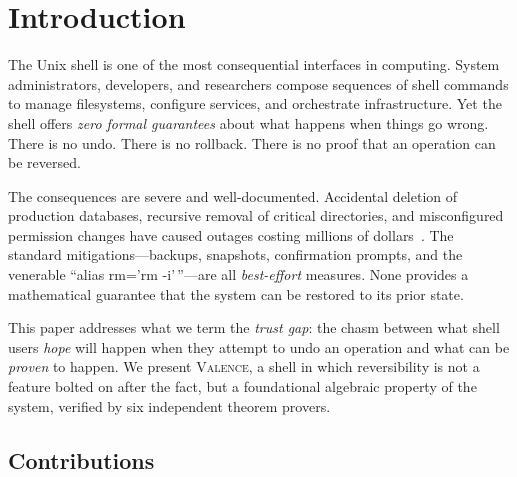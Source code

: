\documentclass[11pt,a4paper]{article}
\newcommand{\valence}{\textsc{Valence}}
\begin{document}
\section{Introduction}
\label{sec:introduction}

The Unix shell is one of the most consequential interfaces in computing. System
administrators, developers, and researchers compose sequences of shell commands
to manage filesystems, configure services, and orchestrate infrastructure. Yet
the shell offers \emph{zero formal guarantees} about what happens when things
go wrong. There is no undo. There is no rollback. There is no proof that an
operation can be reversed.

The consequences are severe and well-documented. Accidental deletion of
production databases, recursive removal of critical directories, and
misconfigured permission changes have caused outages costing millions of
dollars~\citep{gitlab-incident,aws-outage}. The standard mitigations---backups,
snapshots, confirmation prompts, and the venerable ``alias rm='rm -i'\,''---are
all \emph{best-effort} measures. None provides a mathematical guarantee that
the system can be restored to its prior state.

This paper addresses what we term the \emph{trust gap}: the chasm between what
shell users \emph{hope} will happen when they attempt to undo an operation and
what can be \emph{proven} to happen. We present \valence{}, a shell in which
reversibility is not a feature bolted on after the fact, but a foundational
algebraic property of the system, verified by six independent theorem provers.

\subsection{Contributions}
\end{document}
